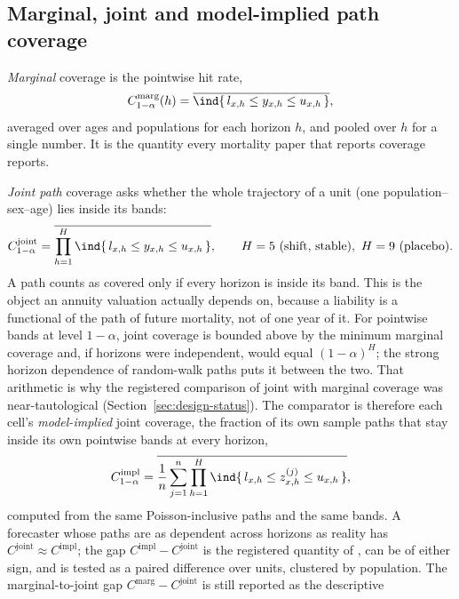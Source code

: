 \subsection{Marginal, joint and model-implied path coverage}
\label{sec:metrics-coverage}

\emph{Marginal} coverage is the pointwise hit rate,
\begin{equation}
  C^{\mathrm{marg}}_{1-\alpha}(h) = \overline{\ind\{\,l_{x,h}\le y_{x,h}\le u_{x,h}\,\}},
\end{equation}
averaged over ages and populations for each horizon $h$, and pooled over
$h$ for a single number. It is the quantity every mortality paper that
reports coverage reports.

\emph{Joint path} coverage asks whether the whole trajectory of a unit
(one population--sex--age) lies inside its bands:
\begin{equation}
  C^{\mathrm{joint}}_{1-\alpha} = \overline{\prod_{h=1}^{H}\ind\{\,l_{x,h}\le y_{x,h}\le u_{x,h}\,\}},
  \qquad H=5 \text{ (shift, stable)},\ H=9 \text{ (placebo)}.
\end{equation}
A path counts as covered only if every horizon is inside its band. This is
the object an annuity valuation actually depends on, because a liability is
a functional of the path of future mortality, not of one year of it. For
pointwise bands at level $1-\alpha$, joint coverage is bounded above by the
minimum marginal coverage and, if horizons were independent, would equal
$(1-\alpha)^H$; the strong horizon dependence of random-walk paths puts it
between the two. That arithmetic is why the registered comparison of joint
with marginal coverage was near-tautological (Section~\ref{sec:design-status}).
The comparator is therefore each cell's \emph{model-implied} joint
coverage, the fraction of its own sample paths that stay inside its own
pointwise bands at every horizon,
\begin{equation}
  C^{\mathrm{impl}}_{1-\alpha} = \overline{\frac1n\sum_{j=1}^{n}\prod_{h=1}^{H}
  \ind\{\,l_{x,h}\le z^{(j)}_{x,h}\le u_{x,h}\,\}},
\end{equation}
computed from the same Poisson-inclusive paths and the same bands. A
forecaster whose paths are as dependent across horizons as reality has
$C^{\mathrm{joint}}\approx C^{\mathrm{impl}}$; the gap
$C^{\mathrm{impl}}-C^{\mathrm{joint}}$ is the registered quantity of
\Hthree, can be of either sign, and is tested as a paired difference over
units, clustered by population. The marginal-to-joint gap
$C^{\mathrm{marg}}-C^{\mathrm{joint}}$ is still reported as the descriptive
